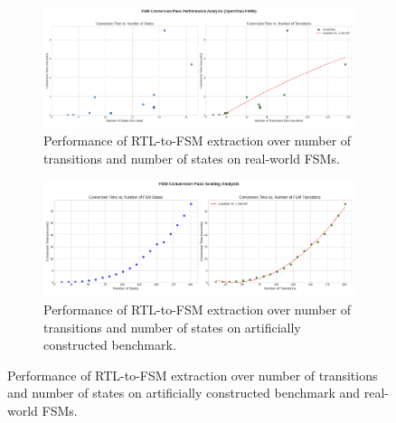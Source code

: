\documentclass[acmsmall,screen,review]{acmart}
\begin{document}
\begin{figure}[ht]
    \begin{subfigure}[t]{0.49\textwidth}

  \includegraphics[width=\columnwidth]{fsm_conversion_performance_plot.png}

\caption{Performance of RTL-to-FSM extraction over number of transitions and number of states on real-world FSMs.}
\end{subfigure}
    \hfill
    \begin{subfigure}[t]{0.49\textwidth}
  \includegraphics[width=\columnwidth]{fsm_conversion_scaling_plot.png}

\caption{Performance of RTL-to-FSM extraction over number of transitions and number of states on artificially constructed benchmark.}
\end{subfigure}

\caption{Performance of RTL-to-FSM extraction over number of transitions and number of states on artificially constructed benchmark and real-world FSMs.}
\label{fig:fsm-performance}
\end{figure}
\end{document}
